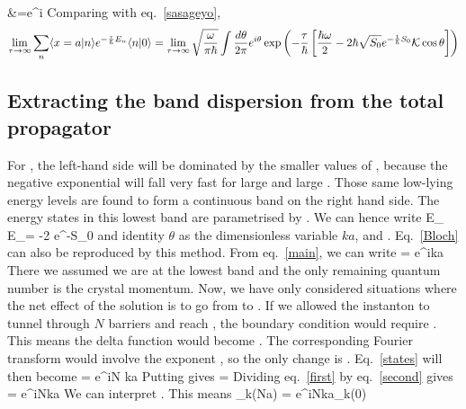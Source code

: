 \documentclass[12pt]{article}
\begin{document}
					  &=\sqrt{\fr{ \omega  }{\pi \hbar }}\int {}e^{i\theta} 
\eeq
Comparing with eq.~\ref{sasageyo},
\begin{equation}\begin{aligned}
\label{main}
\lim_{\tau \to \infty}\sum_n \langle{x=a|n}\rangle e^{-\frac{\tau}{\hbar}E_n} \langle{n|0}\rangle = \lim_{\tau \to \infty}\sqrt{\frac{ \omega  }{\pi \hbar }}\int \frac{d\theta}{2\pi}e^{i\theta} \exp\left({-\frac{\tau}{\hbar}\left[{\frac{\hbar\omega}{2}-2\hbar\sqrt{S_0} e^{-\frac{1}{\hbar}S_0}\mathcal{K}\cos\theta}\right]}\right)\\
\end{aligned}\end{equation}
\subsection*{Extracting the band dispersion from the total propagator}
For \il{\tau \ra \infty}, the left-hand side will be dominated by the smaller values of , because the negative exponential will fall very fast for large \il{\tau} and large . Those same low-lying energy levels are found to form a continuous band on the right hand side. The energy states in this lowest band are parametrised by \il{\theta}. We can hence write
\beq
E_ \approx E_\theta = -2\hbar{} e^{-S_0}\cos\theta
\eeq
and identity \(\theta\) as the dimensionless variable \(ka\), and . Eq.~\ref{Bloch}  can also be reproduced by this method. From eq.~\ref{main}, we can write
\beq[states]
 = \sqrt{\fr{ \omega  }{\pi \hbar }}e^{ika}
\eeq
There we assumed we are at the lowest band and the only remaining quantum number is the crystal momentum. Now, we have only considered situations where the net effect of the solution is to go from  to . If we allowed the instanton to tunnel through \(N\) barriers and reach , the boundary condition would require . This means the delta function would become . The corresponding Fourier transform would involve the exponent , so the only change is  . Eq.~\ref{states} will then become
\beq[first]
 = \sqrt{\fr{ \omega  }{\pi \hbar }}e^{iN ka}
\eeq
Putting  gives
\beq[second]
 = \sqrt{\fr{ \omega  }{\pi \hbar }}
\eeq
Dividing eq.~\ref{first} by eq.~\ref{second} gives
\beq
{}= e^{iNka}
\eeq
We can interpret . This means
\beq[guren]
\psi_k(Na) = e^{iNka}\psi_k(0)
\eeq
\end{document}
